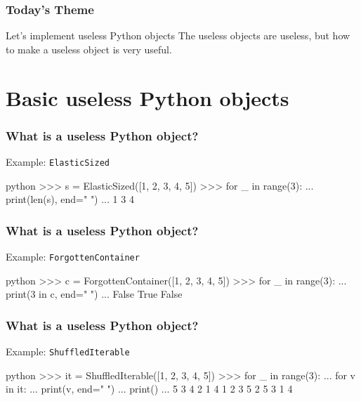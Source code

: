 \documentclass[aspectratio=169,dvipdfmx,14pt,notheorems]{beamer}
\theoremstyle{definition}
\begin{document}
\begin{frame}\frametitle{Today's Theme}

\begin{block}{Let's implement useless Python objects}
The useless objects are useless, but how to make a useless object is very useful.
\end{block}

\end{frame}

\section{Basic useless Python objects}

\begin{frame}[fragile]\frametitle{What is a useless Python object?}

\begin{exampleblock}{Example: \texttt{ElasticSized}}
\begin{pygments}{python}
>>> s = ElasticSized([1, 2, 3, 4, 5])
>>> for _ in range(3):
...     print(len(s), end=" ")
...
1 3 4
\end{pygments}
\end{exampleblock}

\end{frame}

\begin{frame}[fragile]\frametitle{What is a useless Python object?}

\begin{exampleblock}{Example: \texttt{ForgottenContainer}}
\begin{pygments}{python}
>>> c = ForgottenContainer([1, 2, 3, 4, 5])
>>> for _ in range(3):
...     print(3 in c, end=" ")
...
False True False
\end{pygments}
\end{exampleblock}

\end{frame}

\begin{frame}[fragile]\frametitle{What is a useless Python object?}

\begin{exampleblock}{Example: \texttt{ShuffledIterable}}
\begin{pygments}{python}
>>> it = ShuffledIterable([1, 2, 3, 4, 5])
>>> for _ in range(3):
...     for v in it:
...         print(v, end=" ")
...     print()
...
5 3 4 2 1 
4 1 2 3 5 
2 5 3 1 4
\end{pygments}
\end{exampleblock}

\end{frame}
\end{document}

